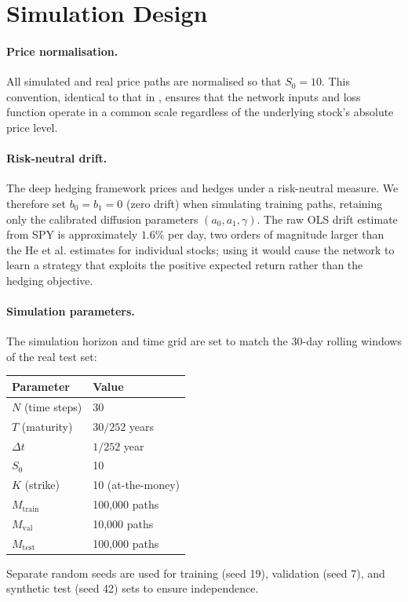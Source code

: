 \section{Simulation Design}%
\label{sec:gad_simulation}

\paragraph{Price normalisation.}
All simulated and real price paths are normalised so that $S_0 = 10$.  This
convention, identical to that in \citet{he2025}, ensures that the network
inputs and loss function operate in a common scale regardless of the
underlying stock's absolute price level.

\paragraph{Risk-neutral drift.}
The deep hedging framework prices and hedges under a risk-neutral measure.
We therefore set $b_0 = b_1 = 0$ (zero drift) when simulating training paths,
retaining only the calibrated diffusion parameters $(a_0, a_1, \gamma)$.  The
raw OLS drift estimate from SPY is approximately $1.6\%$ per day, two orders
of magnitude larger than the He et al. estimates for individual stocks; using
it would cause the network to learn a strategy that exploits the positive
expected return rather than the hedging objective.

\paragraph{Simulation parameters.}
The simulation horizon and time grid are set to match the 30-day rolling
windows of the real test set:
\begin{center}
\begin{tabular}{ll}
  \toprule
  Parameter & Value \\
  \midrule
  $N$ (time steps) & 30 \\
  $T$ (maturity)   & $30/252$ years \\
  $\Delta t$       & $1/252$ year \\
  $S_0$            & 10 \\
  $K$ (strike)     & 10 (at-the-money) \\
  \midrule
  $M_{\mathrm{train}}$ & 100{,}000 paths \\
  $M_{\mathrm{val}}$   & 10{,}000 paths  \\
  $M_{\mathrm{test}}$  & 100{,}000 paths \\
  \bottomrule
\end{tabular}
\end{center}
Separate random seeds are used for training (seed 19), validation (seed 7),
and synthetic test (seed 42) sets to ensure independence.

